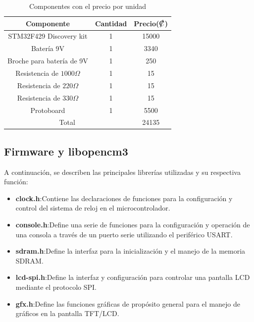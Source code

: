\documentclass[12pt,a4paper]{article}
\DeclareRobustCommand{\Colon}{{%
  \ooalign{%
    \hidewidth\raisebox{0.2ex}{/}\kern0.1em\hidewidth\cr
    C\cr
    \hidewidth\kern0.1em\raisebox{0.2ex}{/}\hidewidth\cr
  }%
}}
\begin{document}
\begin{table}[H]
\centering
\caption{Componentes con el precio por unidad }
\begin{tabular}{|cc|c|}
\hline
\multicolumn{1}{|c|}{\textbf{Componente}} & \textbf{Cantidad} & \textbf{Precio($\Colon$)} \\ \hline
\multicolumn{1}{|c|}{STM32F429 Discovery kit} & 1 & 15000 \\ \hline
\multicolumn{1}{|c|}{Batería 9V} & 1 & 3340 \\ \hline
\multicolumn{1}{|c|}{Broche para batería de 9V} & 1 & 250 \\ \hline
\multicolumn{1}{|c|}{Resistencia de $1000\Omega$} & 1 & 15 \\ \hline
\multicolumn{1}{|c|}{Resistencia de $220\Omega$} & 1 & 15 \\ \hline
\multicolumn{1}{|c|}{Resistencia de $330\Omega$} & 1 & 15 \\ \hline
\multicolumn{1}{|c|}{Protoboard} & 1 & 5500 \\ \hline
\multicolumn{2}{|c|}{Total} &  24135\\ \hline
\end{tabular}
\label{tab:my-table}
\end{table}

\subsection{Firmware y libopencm3}
A continuación, se describen las principales librerías utilizadas y su respectiva función:
\begin{itemize}

    \item \textbf{clock.h}:Contiene las declaraciones de funciones para la configuración y control del sistema de reloj en el microcontrolador.
    \item \textbf{console.h}:Define una serie de funciones para la configuración y operación de una consola a través de un puerto serie utilizando el periférico USART.
    \item \textbf{sdram.h}:Define la interfaz para la inicialización y el manejo de la memoria SDRAM.
    \item \textbf{lcd-spi.h}:Define la interfaz y configuración para controlar una pantalla LCD mediante el protocolo SPI.
    \item \textbf{gfx.h}:Define las funciones gráficas de propósito general para el manejo de gráficos en la pantalla TFT/LCD.
    
\end{itemize}
\end{document}
